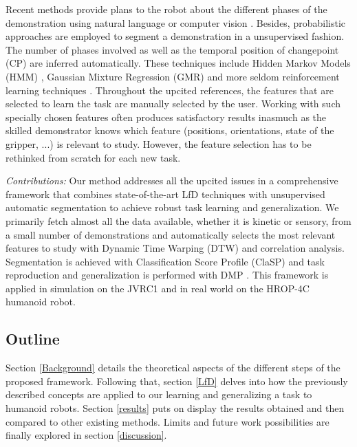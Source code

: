 \documentclass[conference]{IEEEtran}
\begin{document}
Recent methods provide plans to the robot about the different phases of the demonstration using natural language or computer vision \cite{caccavale_kinesthetic_2019} \cite{saran_enhancing_2019}. Besides, probabilistic approaches are employed to segment a demonstration in a unsupervised fashion. The number of phases involved as well as the temporal position of changepoint (CP) are inferred automatically. These techniques include Hidden Markov Models (HMM) \cite{niekum_learning_2015}, Gaussian Mixture Regression (GMR) \cite{calinon_learning_2010} \cite{calinon_learning_2007} and more seldom reinforcement learning techniques \cite{kroemer_towards_2015}. Throughout the upcited references, the features that are selected to learn the task are manually selected by the user. Working with such specially chosen features often produces satisfactory results inasmuch as the skilled demonstrator knows which feature (positions, orientations, state of the gripper, ...) is relevant to study. However, the feature selection has to be rethinked from scratch for each new task.\newline


\textit{Contributions:} 
Our method addresses all the upcited issues in a comprehensive framework that combines state-of-the-art LfD techniques with unsupervised automatic segmentation to achieve robust task learning and generalization. We primarily fetch almost all the data available, whether it is kinetic  or sensory, from a small number of demonstrations and automatically selects the most relevant features to study with Dynamic Time Warping (DTW) and correlation analysis. Segmentation is achieved with Classification Score Profile (ClaSP) \cite{clasp} and task reproduction and generalization is performed with DMP \cite{ijspeert_movement_2002} \cite{ijspeert_dynamical_2013}. This framework is applied in simulation on the JVRC1 and in real world on the HROP-4C humanoid robot.

\subsection{Outline}

Section \ref{Background} details the theoretical aspects of the different steps of the proposed framework. Following that, section \ref{LfD} delves into how the previously described concepts are applied to our learning and generalizing a task to humanoid robots. Section \ref{results} puts on display the results obtained and then compared to other existing methods. Limits and future work possibilities are finally explored in section \ref{discussion}.
\end{document}

